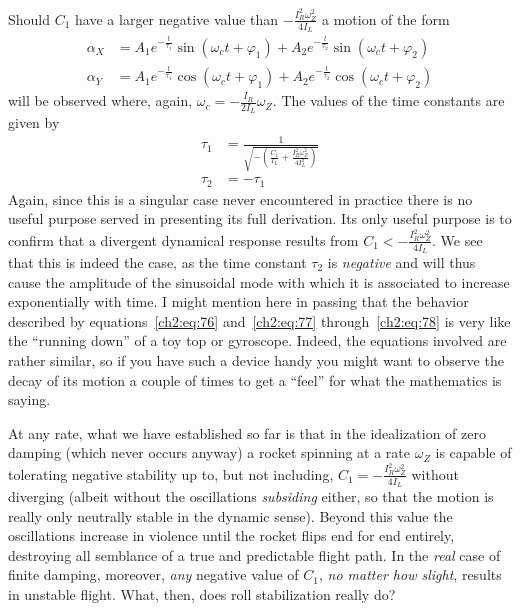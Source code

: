 Should $C_1$ have a larger negative value than
$-\frac{I_R^{2}\omega_Z^{2}}{4I_L}$ a motion of the form
\begin{equation}\label{ch2:eq:77}
\begin{aligned}
\alpha_X &= A_1 e^{-\frac{t}{\tau_1}}\sin(\omega_c t + \varphi_1)
  + A_2 e^{-\frac{t}{\tau_2}}\sin(\omega_c t + \varphi_2)\\
\alpha_Y &= A_1 e^{-\frac{t}{\tau_1}}\cos(\omega_c t + \varphi_1)
  + A_2 e^{-\frac{t}{\tau_2}}\cos(\omega_c t + \varphi_2)
\end{aligned}
\end{equation}
will be observed where, again, $\omega_c = -\frac{I_R}{2I_L}\omega_Z$. The
values of the time constants are given by
\begin{subequations}\label{ch2:eq:78}
\begin{align}
\tau_1 &= \frac{1}{\sqrt{-\left(\frac{C_1}{I_L}
  + \frac{I_R^{2}\omega_Z^{2}}{4I_L^{2}}\right)}}\label{ch2:eq:78a}\\
\tau_2 &= -\tau_1\label{ch2:eq:78b}
\end{align}
\end{subequations}
Again, since this is a singular case never encountered in practice there is
no useful purpose served in presenting its full derivation. Its only useful
purpose is to confirm that a divergent dynamical response results from
$C_1 < -\frac{I_R^{2}\omega_Z^{2}}{4I_L}$. We see that this is indeed the
case, as the time constant $\tau_2$ is \emph{negative} and will thus cause the
amplitude of the sinusoidal mode with which it is associated to increase
exponentially with time. I might mention here in passing that the behavior
described by equations~\eqref{ch2:eq:76} and~\eqref{ch2:eq:77}
through~\eqref{ch2:eq:78} is very like the ``running down'' of a toy top or
gyroscope. Indeed, the equations involved are rather similar, so if you have
such a device handy you might want to observe the decay of its motion a couple
of times to get a ``feel'' for what the mathematics is saying.

At any rate, what we have established so far is that in the idealization of
zero damping (which never occurs anyway) a rocket spinning at a rate
$\omega_Z$ is capable of tolerating negative stability up to, but not
including, $C_1 = -\frac{I_R^{2}\omega_Z^{2}}{4I_L}$ without diverging (albeit
without the oscillations \emph{subsiding} either, so that the motion is really
only neutrally stable in the dynamic sense). Beyond this value the
oscillations increase in violence until the rocket flips end for end entirely,
destroying all semblance of a true and predictable flight path. In the
\emph{real} case of finite damping, moreover, \emph{any} negative value of
$C_1$, \emph{no matter how slight}, results in unstable flight. What, then,
does roll stabilization really do?

